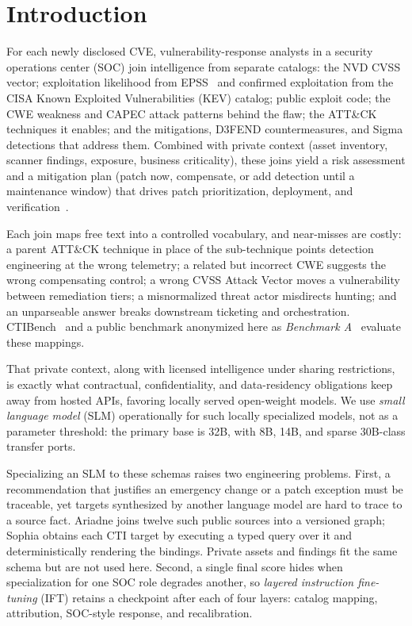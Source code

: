 \documentclass[conference]{IEEEtran}
\begin{document}
\section{Introduction}
For each newly disclosed CVE, vulnerability-response analysts in a security operations center (SOC) join intelligence from separate catalogs: the NVD CVSS vector; exploitation likelihood from EPSS~\cite{jacobs2021epss} and confirmed exploitation from the CISA Known Exploited Vulnerabilities (KEV) catalog; public exploit code; the CWE weakness and CAPEC attack patterns behind the flaw; the ATT\&CK techniques it enables; and the mitigations, D3FEND countermeasures, and Sigma detections that address them. Combined with private context (asset inventory, scanner findings, exposure, business criticality), these joins yield a risk assessment and a mitigation plan (patch now, compensate, or add detection until a maintenance window) that drives patch prioritization, deployment, and verification~\cite{nist80040r4}.

Each join maps free text into a controlled vocabulary, and near-misses are costly: a parent ATT\&CK technique in place of the sub-technique points detection engineering at the wrong telemetry; a related but incorrect CWE suggests the wrong compensating control; a wrong CVSS Attack Vector moves a vulnerability between remediation tiers; a misnormalized threat actor misdirects hunting; and an unparseable answer breaks downstream ticketing and orchestration. CTIBench~\cite{ctibench} and a public benchmark anonymized here as \emph{Benchmark A}~\cite{anonbench} evaluate these mappings.

That private context, along with licensed intelligence under sharing restrictions, is exactly what contractual, confidentiality, and data-residency obligations keep away from hosted APIs, favoring locally served open-weight models. We use \emph{small language model} (SLM) operationally for such locally specialized models, not as a parameter threshold: the primary base is 32B, with 8B, 14B, and sparse 30B-class transfer ports.

Specializing an SLM to these schemas raises two engineering problems. First, a recommendation that justifies an emergency change or a patch exception must be traceable, yet targets synthesized by another language model are hard to trace to a source fact. Ariadne joins twelve such public sources into a versioned graph; Sophia obtains each CTI target by executing a typed query over it and deterministically rendering the bindings. Private assets and findings fit the same schema but are not used here. Second, a single final score hides when specialization for one SOC role degrades another, so \emph{layered instruction fine-tuning} (IFT) retains a checkpoint after each of four layers: catalog mapping, attribution, SOC-style response, and recalibration.
\end{document}
